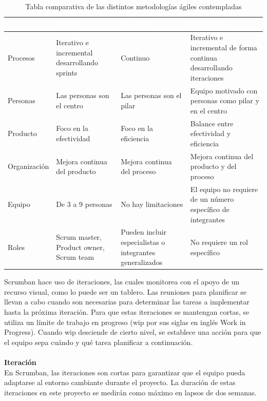 \documentclass[12pt, a4paper, titlepage]{report}
\begin{document}
	    \begin{table}[htbp!]
	    	\caption[Comparación de metodologías ágiles]{Tabla comparativa de las distintos metodologías ágiles contempladas}
	    	\begin{tabular}{|m{1.75cm}|m{2.75cm}|m{2.75cm}|m{4.75cm}|}
	    		\hline    			
	    		\rowcolor{guindapoli}
	    		 & \hfil {\textbf{\textcolor{white}{Scrum}}} & \hfil {\textbf{\textcolor{white}{Kanban}}} & \hfil {\textbf{\textcolor{white}{Scrumban}}}\\
	    		\hline
	    		 \hfil Procesos & Iterativo e incremental desarrollando sprints & \hfil Continuo & Iterativo e incremental de forma continua desarrollando iteraciones \\
	    		 \hline
	    		 \hfil Personas & Las personas son el centro & Las personas son el pilar & Equipo motivado con personas como pilar y en el centro \\
	    		 \hline
	    		 \hfil Producto & Foco en la efectividad & Foco en la eficiencia & Balance entre efectividad y eficiencia \\
	    		 \hline
	    		 \hfil Organización & Mejora continua del producto & Mejora continua del proceso & Mejora continua del producto y del proceso\\
	    		 \hline
	    		 \hfil Equipo & De 3 a 9 personas & No hay limitaciones & El equipo no requiere de un número específico de integrantes \\
	    		 \hline
	    		 \hfil Roles & Scrum master, Product owner, Scrum team & Pueden incluir especialistas o integrantes generalizados & No requiere un rol específico \\
	    		 \hline
	    	\end{tabular}
	    \end{table}
	    Scrumban hace uso de iteraciones, las cuales monitorea con el apoyo de un recurso visual, como lo puede ser un tablero. Las reuniones para planificar se llevan a cabo cuando son necesarias para determinar las tareas a implementar hasta la próxima iteración. Para que estas iteraciones se mantengan cortas, se utiliza un límite de trabajo en progreso (\acrshort{wip} por sus siglas en inglés Work in Progress). Cuando \acrshort{wip} desciende de cierto nivel, se establece una acción para que el equipo sepa cuándo y qué tarea planificar a continuación.\\\\
	    \textbf{Iteración}\\
	    En Scrumban, las iteraciones son cortas para garantizar que el equipo pueda adaptarse al entorno cambiante durante el proyecto. La duración de estas iteraciones en este proyecto se medirán como máximo en lapsos de dos semanas.\\
\end{document}
